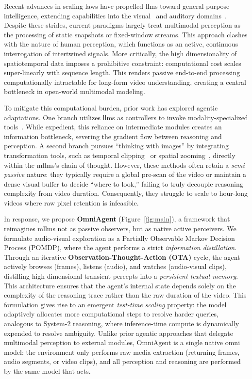 \documentclass{article}
\theoremstyle{plain}
\theoremstyle{definition}
\theoremstyle{remark}
\newcommand{\model}{OmniAgent\xspace}
\begin{document}
Recent advances in scaling laws have propelled \acp{llm} toward general-purpose intelligence, extending capabilities into the visual~\cite{blip2, llava, qwen2.5vl, videollava} and auditory domains~\cite{qwen2audio, qwen2.5omni}. Despite these strides, current paradigms largely treat multimodal perception as the processing of static snapshots or fixed-window streams. This approach clashes with the nature of human perception, which functions as an active, continuous interrogation of intertwined signals. More critically, the high dimensionality of spatiotemporal data imposes a prohibitive constraint: computational cost scales super-linearly with sequence length. This renders passive end-to-end processing computationally intractable for long-form video understanding, creating a central bottleneck in open-world multimodal modeling.

To mitigate this computational burden, prior work has explored agentic adaptations. One branch utilizes \acp{llm} as controllers to invoke modality-specialized tools~\cite{videoagent, dvd, m3-agent}. While expedient, this reliance on intermediate modules creates an information bottleneck, severing the gradient flow between reasoning and perception. A second branch pursues ``thinking with images'' by integrating transformation tools, such as temporal clipping~\cite{vital, longvt} or spatial zooming~\cite{zoomzero}, directly within the \acp{mllm}'s chain-of-thought. However, these methods often retain a \textit{semi-passive} nature: they typically require a global pre-scan of the video or maintain a dense visual buffer to decide ``where to look,'' failing to truly decouple reasoning complexity from video duration. Consequently, they struggle to scale to hour-long videos where raw pixel retention is infeasible.

In response, we propose \textbf{\model} (Figure~\ref{fig:main}), a framework that reimagines \acp{mllm} not as passive observers, but as native active perceivers. We formulate audio-visual exploration as a Partially Observable Markov Decision Process (POMDP), where the agent performs a strict \textit{information distillation}. Through an iterative \textbf{Observation-Thought-Action (OTA)} cycle,
the agent actively browses (frames), listens (audio), and watches (audio-visual clips),
distilling high-dimensional transient percepts into a \textit{persistent textual memory}. This architecture ensures that the agent's internal state depends solely on the complexity of the reasoning trace rather than the raw duration of the video. This formulation gives rise to an emergent \textit{test-time scaling} property: the model adaptively allocates more computational steps to resolve harder queries, analogous to System-2 reasoning, where inference-time compute is dynamically expended to resolve ambiguity.
Unlike prior agentic approaches that delegate multimodal perception to external modules, \model is a single native omni model: the environment only performs raw media extraction (returning frames, audio segments, or video clips), and all perception and reasoning are performed by the same model that acts.
\end{document}
